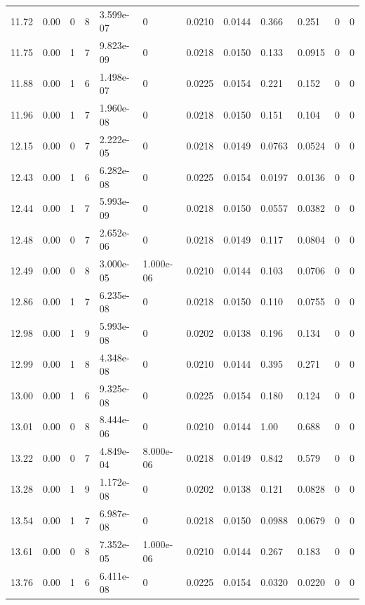 \documentclass[preview]{standalone}
\begin{document}
{{{{\begin{tabular}{L{1.2cm}C{1.2cm} C{0.3cm}C{0.5cm} C{1.4cm}C{1.4cm} C{1.4cm}C{1.4cm} C{1.6cm}C{1.6cm} C{1.6cm}C{1.6cm}}
  11.72  &  0.00  & 0     &  8 &  3.599e-07  & 0  &  0.0210&   0.0144& 0.366 & 0.251   &  0 & 0  \\ 
  11.75  &  0.00  & 1     &  7 &  9.823e-09  & 0  &  0.0218&   0.0150& 0.133 & 0.0915   &  0 & 0  \\ 
  11.88  &  0.00  & 1     &  6 &  1.498e-07  & 0  &  0.0225&   0.0154& 0.221 & 0.152   &  0 & 0  \\ 
  11.96  &  0.00  & 1     &  7 &  1.960e-08  & 0  &  0.0218&   0.0150& 0.151 & 0.104   &  0 & 0  \\ 
  12.15  &  0.00  & 0     &  7 &  2.222e-05  & 0  &  0.0218&   0.0149& 0.0763 & 0.0524   &  0 & 0  \\ 
  12.43  &  0.00  & 1     &  6 &  6.282e-08  & 0  &  0.0225&   0.0154& 0.0197 & 0.0136   &  0 & 0  \\ 
  12.44  &  0.00  & 1     &  7 &  5.993e-09  & 0  &  0.0218&   0.0150& 0.0557 & 0.0382   &  0 & 0  \\ 
  12.48  &  0.00  & 0     &  7 &  2.652e-06  & 0  &  0.0218&   0.0149& 0.117 & 0.0804   &  0 & 0  \\ 
  12.49  &  0.00  & 0     &  8 &  3.000e-05  & 1.000e-06  &  0.0210&   0.0144& 0.103 & 0.0706   &  0 & 0  \\ 
  12.86  &  0.00  & 1     &  7 &  6.235e-08  & 0  &  0.0218&   0.0150& 0.110 & 0.0755   &  0 & 0  \\ 
  12.98  &  0.00  & 1     &  9 &  5.993e-08  & 0  &  0.0202&   0.0138& 0.196 & 0.134   &  0 & 0  \\ 
  12.99  &  0.00  & 1     &  8 &  4.348e-08  & 0  &  0.0210&   0.0144& 0.395 & 0.271   &  0 & 0  \\ 
  13.00  &  0.00  & 1     &  6 &  9.325e-08  & 0  &  0.0225&   0.0154& 0.180 & 0.124   &  0 & 0  \\ 
  13.01  &  0.00  & 0     &  8 &  8.444e-06  & 0  &  0.0210&   0.0144& 1.00 & 0.688   &  0 & 0  \\ 
  13.22  &  0.00  & 0     &  7 &  4.849e-04  & 8.000e-06  &  0.0218&   0.0149& 0.842 & 0.579   &  0 & 0  \\ 
  13.28  &  0.00  & 1     &  9 &  1.172e-08  & 0  &  0.0202&   0.0138& 0.121 & 0.0828   &  0 & 0  \\ 
  13.54  &  0.00  & 1     &  7 &  6.987e-08  & 0  &  0.0218&   0.0150& 0.0988 & 0.0679   &  0 & 0  \\ 
  13.61  &  0.00  & 0     &  8 &  7.352e-05  & 1.000e-06  &  0.0210&   0.0144& 0.267 & 0.183   &  0 & 0  \\ 
  13.76  &  0.00  & 1     &  6 &  6.411e-08  & 0  &  0.0225&   0.0154& 0.0320 & 0.0220   &  0 & 0  \\ 

\end{tabular}}}}}
\end{document}
